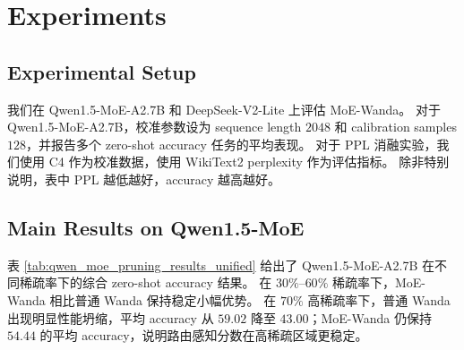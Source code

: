 \documentclass[letterpaper]{article}
\begin{document}
\section{Experiments}

\subsection{Experimental Setup}

我们在 Qwen1.5-MoE-A2.7B 和 DeepSeek-V2-Lite 上评估 MoE-Wanda。
对于 Qwen1.5-MoE-A2.7B，校准参数设为 sequence length $2048$ 和 calibration samples $128$，并报告多个 zero-shot accuracy 任务的平均表现。
对于 PPL 消融实验，我们使用 C4 作为校准数据，使用 WikiText2 perplexity 作为评估指标。
除非特别说明，表中 PPL 越低越好，accuracy 越高越好。

\subsection{Main Results on Qwen1.5-MoE}

表 \ref{tab:qwen_moe_pruning_results_unified} 给出了 Qwen1.5-MoE-A2.7B 在不同稀疏率下的综合 zero-shot accuracy 结果。
在 $30\%$--$60\%$ 稀疏率下，MoE-Wanda 相比普通 Wanda 保持稳定小幅优势。
在 $70\%$ 高稀疏率下，普通 Wanda 出现明显性能坍缩，平均 accuracy 从 $59.02$ 降至 $43.00$；MoE-Wanda 仍保持 $54.44$ 的平均 accuracy，说明路由感知分数在高稀疏区域更稳定。
\end{document}
